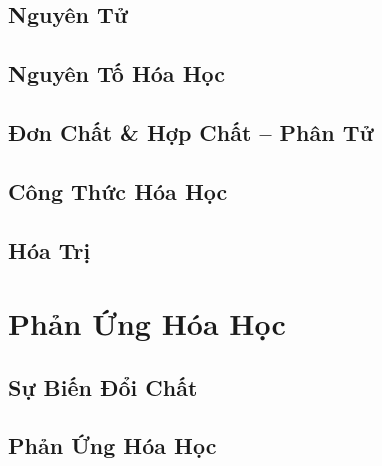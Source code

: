 \documentclass{article}
\numberwithin{equation}{section}
\begin{document}

\subsection{Nguyên Tử}


\subsection{Nguyên Tố Hóa Học}


\subsection{Đơn Chất \& Hợp Chất -- Phân Tử}


\subsection{Công Thức Hóa Học}


\subsection{Hóa Trị}


\section{Phản Ứng Hóa Học}

\subsection{Sự Biến Đổi Chất}


\subsection{Phản Ứng Hóa Học}
\end{document}
